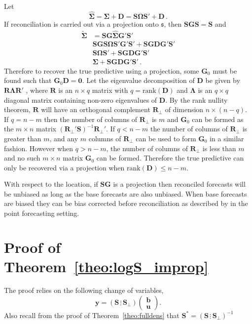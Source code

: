 \documentclass[12pt]{article}
\theoremstyle{definition}
\begin{document}
Let
\[
\hat{\bm{\Sigma}}=\bm{\Sigma}+{\bm D}=\bm{S}\bm{\Omega}{\bm{S}}'+{\bm D}\,.
\]
If reconciliation is carried out via a projection onto $\mathfrak{s}$, then $\bm{S}\bm{G}\bm{S}=\bm{S}$ and
\begin{align}
\tilde{\bm{\Sigma}}&=\bm{S}\bm{G}\hat{\bm{\Sigma}}\bm{G}'\bm{S}'\nonumber\\
&\bm{S}\bm{G}\bm{S}\bm{\Omega}\bm{S}'\bm{G}'{\bm{S}}'+\bm{S}\bm{G}{\bm D}\bm{G}'\bm{S}'\nonumber\\
&\bm{S}\bm{\Omega}{\bm{S}}'+\bm{S}\bm{G}{\bm D}\bm{G}'\bm{S}'\nonumber\\
&\bm{\Sigma}+\bm{S}\bm{G}{\bm D}\bm{G}'\bm{S}'\nonumber\,.
\end{align}
Therefore to recover the true predictive using a projection, some ${\bm G}_0$ must be found such that ${\bm G}_0{\bm D}=\bm{0}$. Let the eigenvalue decomposition of $\bm {D}$ be given by  ${\bm R}{\bm \Lambda}{\bm R}'$ , where ${\bm R}$ is an $n\times q$ matrix with $q=\textrm{rank}({\bm{D}})$ and ${\bm\Lambda}$ is an $q\times q$ diagonal matrix containing non-zero eigenvalues of ${\bm D}$.  By the rank nullity theorem, $\bm{R}$ will have an orthogonal complement $\bm{R}_{\perp}$ of dimension $n\times (n-q)$.  If $q=n-m$ then the number of columns of $\bm{R}_{\perp}$ is $m$ and ${\bm G}_0$ can be formed as the $m\times n$ matrix $(\bm{R}_{\perp}'\bm{S})^{-1}\bm{R}_{\perp}'$.  If $q<n-m$ the number of columns of $\bm{R}_{\perp}$ is greater than $m$, and any $m$ columns of $\bm{R}_{\perp}$ can be used to form ${\bm G}_0$ in a similar fashion.  However when $q>n-m$, the number of columns of $\bm{R}_{\perp}$ is less than $m$ and no such $m\times n$ matrix ${\bm G}_0$ can be formed.  Therefore the true predictive can only be recovered via a projection when $\textrm{rank}({\bm D})\leq n-m$.

With respect to the location, if $\bm{SG}$ is a projection then reconciled forecasts will be unbiased as long as the base forecasts are also unbiased.  When base forecasts are biased they can be bias corrected before reconciliation as described by \cite{PanEtAl2019HF} in the point forecasting setting.

\clearpage
\section{Proof of Theorem~\ref{theo:logS_improp}}\label{app:logS_improp}

The proof relies on the following change of variables,
\[
\bm{y}=\left(\bm{S}\,\vdots\,\bm{S_\perp}\right)\begin{pmatrix}\bm{b}\\\bm{u}\end{pmatrix}.
\]
Also recall from the proof of Theorem~\ref{theo:fulldens} that $\bm{S}^*=\left(\bm{S}\,\vdots\,\bm{S_\perp}\right)^{-1}$
\end{document}
